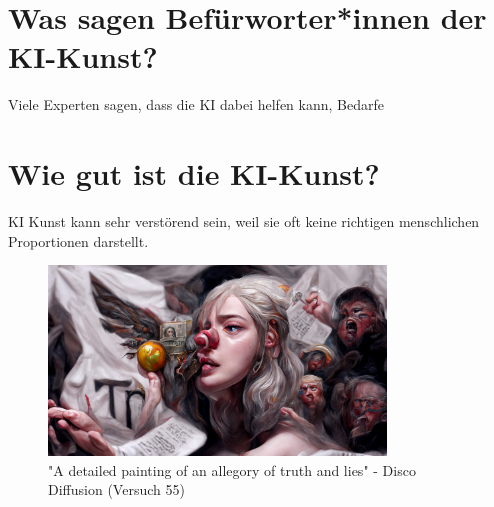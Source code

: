 \documentclass{article}
\begin{document}
\section{Was sagen Befürworter*innen der KI-Kunst?}
    Viele Experten sagen, dass die KI dabei helfen kann, Bedarfe 

\section{Wie gut ist die KI-Kunst?}
    KI Kunst kann sehr verstörend sein, weil sie oft keine richtigen menschlichen Proportionen darstellt.
    \begin{figure}[h]
    \centering
    \includegraphics[width=0.8\textwidth]{ki-bild.png} 
    \caption{"A detailed painting of an allegory of truth and lies" - Disco Diffusion (Versuch 55)}
    \label{fig:ki-bild}
    \end{figure}



\printbibliography
\end{document}

